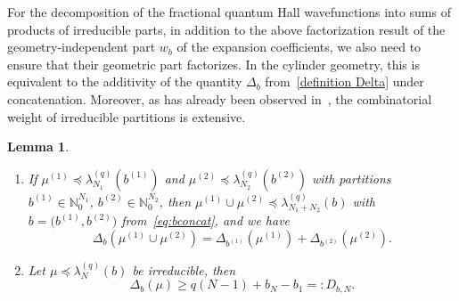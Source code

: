 \documentclass[letterpaper, DIV=17]{scrartcl}
\newtheorem{lemma}[theorem]{Lemma}
\numberwithin{equation}{section}
\theoremstyle{definition}
\begin{document}
			
For the decomposition of the fractional quantum Hall wavefunctions into sums of products of irreducible parts, in addition to the above factorization result of the geometry-independent part $ w_b $ of the expansion coefficients,  we also need to ensure that their geometric part factorizes. 
In the cylinder geometry, this is equivalent to the additivity of the quantity $ \Delta_b $ from~\eqref{definition Delta} under concatenation.  Moreover, as has already been
observed in~\cite{jansen2009symmetry}, the combinatorial weight of irreducible partitions is extensive. 
%
		\begin{lemma}\label{lem:Deltafact}
		\begin{enumerate}
		\item 
			If $\mu^{(1)} \preceq \lambda^{(q)}_{N_1}(b^{(1)}) $ and $\mu^{(2)}\preceq \lambda^{(q)}_{N_2}(b^{(2)}) $ with partitions $ b^{(1)} \in \mathbb{N}_0^{N_1} $, $ b^{(2)} \in \mathbb{N}_0^{N_2} $, then $\mu^{(1)} \cup \mu^{(2)}\preceq \lambda^{(q)}_{N_1+N_2}(b)$ with $ b = \big(b^{(1)},b^{(2)}\big) $ from~\eqref{eq:bconcat}, and we have
			\begin{equation} \label{Delta and factorization}
				\Delta_b(\mu^{(1)}\cup \mu^{(2)}) = \Delta_{b^{(1)}}(\mu^{(1)}) + \Delta_{b^{(2)}}(\mu^{(2)}).
			\end{equation}
		\item
			Let $\mu \preceq \lambda^{(q)}_N(b)$ be irreducible, then 
			\begin{equation} \label{lower bound Delta irreducible}
				\Delta_b(\mu) \geq q(N-1) + b_N - b_1 =: D_{b,N} .
			\end{equation}
		\end{enumerate}
		\end{lemma}
\end{document}
